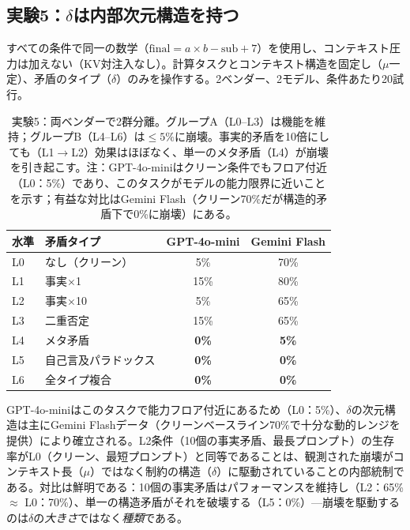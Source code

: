 \documentclass[11pt,a4paper]{article}
\begin{document}
\subsection{実験5：\texorpdfstring{$\delta$}{δ}は内部次元構造を持つ}
\label{sec:llm-delta-structure}

すべての条件で同一の数学（$\text{final} = a \times b - \text{sub} + 7$）を使用し、コンテキスト圧力は加えない（KV対注入なし）。計算タスクとコンテキスト構造を固定し（$\mu$一定）、矛盾のタイプ（$\delta$）のみを操作する。2ベンダー、2モデル、条件あたり20試行。

\begin{table}[htbp]
\centering
\small
\begin{tabular}{llcc}
\toprule
\textbf{水準} & \textbf{矛盾タイプ} & \textbf{GPT-4o-mini} & \textbf{Gemini Flash} \\
\midrule
L0 & なし（クリーン） & 5\% & 70\% \\
L1 & 事実$\times$1 & 15\% & 80\% \\
L2 & 事実$\times$10 & 5\% & 65\% \\
L3 & 二重否定 & 15\% & 65\% \\
\midrule
L4 & メタ矛盾 & \textbf{0\%} & \textbf{5\%} \\
L5 & 自己言及パラドックス & \textbf{0\%} & \textbf{0\%} \\
L6 & 全タイプ複合 & \textbf{0\%} & \textbf{0\%} \\
\bottomrule
\end{tabular}
\caption{実験5：両ベンダーで2群分離。グループA（L0--L3）は機能を維持；グループB（L4--L6）は$\leq 5\%$に崩壊。事実的矛盾を10倍にしても（L1$\to$L2）効果はほぼなく、単一のメタ矛盾（L4）が崩壊を引き起こす。注：GPT-4o-miniはクリーン条件でもフロア付近（L0：5\%）であり、このタスクがモデルの能力限界に近いことを示す；有益な対比はGemini Flash（クリーン70\%だが構造的矛盾下で0\%に崩壊）にある。\protect\footnotemark}
\label{tab:exp5}
\end{table}

GPT-4o-miniはこのタスクで能力フロア付近にあるため（L0：5\%）、$\delta$の次元構造は主にGemini Flashデータ（クリーンベースライン70\%で十分な動的レンジを提供）により確立される。L2条件（10個の事実矛盾、最長プロンプト）の生存率がL0（クリーン、最短プロンプト）と同等であることは、観測された崩壊がコンテキスト長（$\mu$）ではなく制約の構造（$\delta$）に駆動されていることの内部統制である。対比は鮮明である：10個の事実矛盾はパフォーマンスを維持し（L2：65\% $\approx$ L0：70\%）、単一の構造矛盾がそれを破壊する（L5：0\%）---崩壊を駆動するのは$\delta$の\emph{大きさ}ではなく\emph{種類}である。
\end{document}
